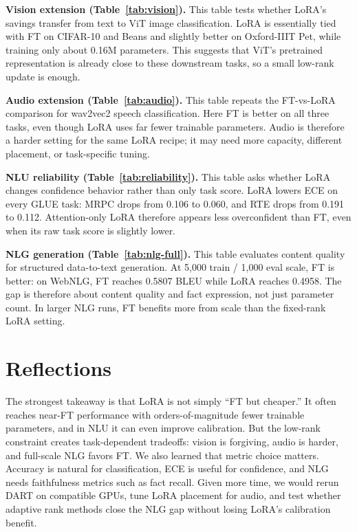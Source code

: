 \documentclass[11pt]{article}
\begin{document}
\textbf{Vision extension (Table~\ref{tab:vision}).} This table tests whether LoRA's savings transfer from text to ViT image classification. LoRA is essentially tied with FT on CIFAR-10 and Beans and slightly better on Oxford-IIIT Pet, while training only about 0.16M parameters. This suggests that ViT's pretrained representation is already close to these downstream tasks, so a small low-rank update is enough.

\textbf{Audio extension (Table~\ref{tab:audio}).} This table repeats the FT-vs-LoRA comparison for wav2vec2 speech classification. Here FT is better on all three tasks, even though LoRA uses far fewer trainable parameters. Audio is therefore a harder setting for the same LoRA recipe; it may need more capacity, different placement, or task-specific tuning.

\textbf{NLU reliability (Table~\ref{tab:reliability}).} This table asks whether LoRA changes confidence behavior rather than only task score. LoRA lowers ECE on every GLUE task: MRPC drops from 0.106 to 0.060, and RTE drops from 0.191 to 0.112. Attention-only LoRA therefore appears less overconfident than FT, even when its raw task score is slightly lower.

\textbf{NLG generation (Table~\ref{tab:nlg-full}).} This table evaluates content quality for structured data-to-text generation. At 5,000 train / 1,000 eval scale, FT is better: on WebNLG, FT reaches 0.5807 BLEU while LoRA reaches 0.4958. The gap is therefore about content quality and fact expression, not just parameter count. In larger NLG runs, FT benefits more from scale than the fixed-rank LoRA setting.

\section{Reflections}
The strongest takeaway is that LoRA is not simply ``FT but cheaper.'' It often reaches near-FT performance with orders-of-magnitude fewer trainable parameters, and in NLU it can even improve calibration. But the low-rank constraint creates task-dependent tradeoffs: vision is forgiving, audio is harder, and full-scale NLG favors FT. We also learned that metric choice matters. Accuracy is natural for classification, ECE is useful for confidence, and NLG needs faithfulness metrics such as fact recall. Given more time, we would rerun DART on compatible GPUs, tune LoRA placement for audio, and test whether adaptive rank methods close the NLG gap without losing LoRA's calibration benefit.
\end{document}
